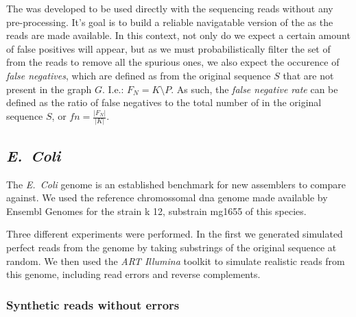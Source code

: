 The \dBCM was developed to be used directly with the sequencing reads without any pre-processing. It's goal is to build a reliable
navigatable version of the \dBG as the reads are made available. In this context, not only do we expect a certain amount of false
positives will appear, but as we must probabilistically filter the set of  from the reads to remove all the spurious ones, we
also expect the occurence of \emph{false negatives}, which are defined as  from the original sequence $S$ that are not present
in the graph $G$. I.e.: $F_N=K \setminus P$. As such, the \emph{false negative rate} can be defined as the ratio of false negatives
to the total number of  in the original sequence $S$, or $\mathit{fn}=\frac{|F_N|}{|K|}$.

\subsubsection{\dBHT}

\subsection{\emph{E.~Coli}}

The \emph{E.~Coli} genome is an established benchmark for new assemblers to compare against. We used the reference chromossomal dna
genome made available by Ensembl Genomes for the strain k 12, substrain mg1655 of this species\cite{ecoligenome}.


Three different experiments were performed. In the first we generated simulated perfect reads from the genome by taking substrings of 
the original sequence at random. We then used the \emph{ART Illumina} toolkit \cite{Huang2011} to simulate realistic reads from this
genome, including read errors and reverse complements. 

\subsubsection{Synthetic reads without errors}

